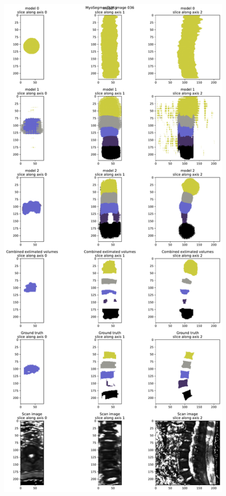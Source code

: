 \begin{figure}
    \centering
    \includegraphics[width=.95\textwidth]{images/comb1_denoise2_erode1_MyoSegmenTUM_036.pdf}

\end{figure}
